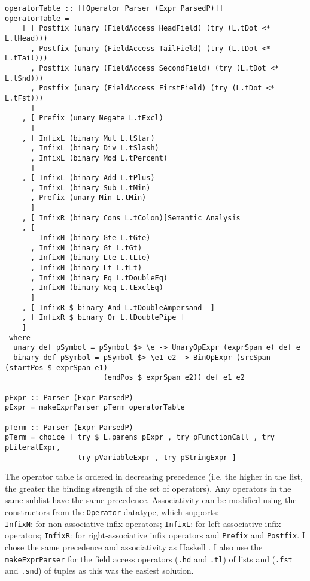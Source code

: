\documentclass{report}
\begin{document}
\begin{verbatim}
operatorTable :: [[Operator Parser (Expr ParsedP)]]
operatorTable =
    [ [ Postfix (unary (FieldAccess HeadField) (try (L.tDot <* L.tHead)))
      , Postfix (unary (FieldAccess TailField) (try (L.tDot <* L.tTail)))
      , Postfix (unary (FieldAccess SecondField) (try (L.tDot <* L.tSnd)))
      , Postfix (unary (FieldAccess FirstField) (try (L.tDot <* L.tFst)))
      ]
    , [ Prefix (unary Negate L.tExcl)
      ]
    , [ InfixL (binary Mul L.tStar)
      , InfixL (binary Div L.tSlash)
      , InfixL (binary Mod L.tPercent)
      ]
    , [ InfixL (binary Add L.tPlus)
      , InfixL (binary Sub L.tMin)
      , Prefix (unary Min L.tMin)
      ]
    , [ InfixR (binary Cons L.tColon)]Semantic Analysis 
    , [
        InfixN (binary Gte L.tGte) 
      , InfixN (binary Gt L.tGt)
      , InfixN (binary Lte L.tLte)
      , InfixN (binary Lt L.tLt)
      , InfixN (binary Eq L.tDoubleEq)
      , InfixN (binary Neq L.tExclEq)
      ]
    , [ InfixR $ binary And L.tDoubleAmpersand  ]
    , [ InfixR $ binary Or L.tDoublePipe ]
    ]
 where 
  unary def pSymbol = pSymbol $> \e -> UnaryOpExpr (exprSpan e) def e
  binary def pSymbol = pSymbol $> \e1 e2 -> BinOpExpr (srcSpan (startPos $ exprSpan e1) 
                       (endPos $ exprSpan e2)) def e1 e2

pExpr :: Parser (Expr ParsedP)
pExpr = makeExprParser pTerm operatorTable

pTerm :: Parser (Expr ParsedP)
pTerm = choice [ try $ L.parens pExpr , try pFunctionCall , try pLiteralExpr, 
                 try pVariableExpr , try pStringExpr ]
\end{verbatim}

The operator table is ordered in decreasing precedence (i.e. the higher in the list, the greater the binding strength of the set of operators). Any operators in the same sublist have the same precedence. Associativity can be modified using the constructors from the \texttt{Operator} datatype, which supports: \\
\texttt{InfixN}: for non‑associative infix operators; \texttt{InfixL}: for left‑associative infix operators; \texttt{InfixR}: for right‑associative infix operators and \texttt{Prefix} and \texttt{Postfix}.
I chose the same precedence and associativity as Haskell \href{https://rosettacode.org/wiki/Operator_precedence#Haskell}{\cite{OperatorPrecedenceHaskell}}. I also use the \texttt{makeExprParser} for the field access operators (\texttt{.hd} and \texttt{.tl}) of lists and (\texttt{.fst} and \texttt{.snd}) of tuples as this was the easiest solution.
\end{document}
